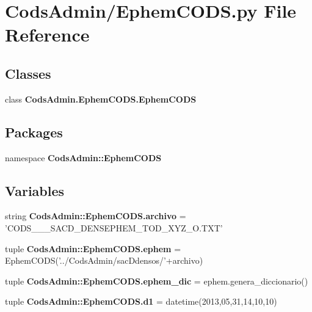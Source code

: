 \section{\-Cods\-Admin/\-Ephem\-C\-O\-D\-S.py \-File \-Reference}
\label{_ephem_c_o_d_s_8py}
\subsection*{\-Classes}
\begin{DoxyCompactItemize}
\item 
class {\bf \-Cods\-Admin.\-Ephem\-C\-O\-D\-S.\-Ephem\-C\-O\-D\-S}
\end{DoxyCompactItemize}
\subsection*{\-Packages}
\begin{DoxyCompactItemize}
\item 
namespace {\bf \-Cods\-Admin\-::\-Ephem\-C\-O\-D\-S}
\end{DoxyCompactItemize}
\subsection*{\-Variables}
\begin{DoxyCompactItemize}
\item 
string {\bf \-Cods\-Admin\-::\-Ephem\-C\-O\-D\-S.\-archivo} = '\-C\-O\-D\-S\-\_\-\_\-\_\-\-S\-A\-C\-D\-\_\-\-D\-E\-N\-S\-E\-P\-H\-E\-M\-\_\-\-T\-O\-D\-\_\-\-X\-Y\-Z\-\_\-\-O.\-T\-X\-T'
\item 
tuple {\bf \-Cods\-Admin\-::\-Ephem\-C\-O\-D\-S.\-ephem} = \-Ephem\-C\-O\-D\-S('../\-Cods\-Admin/sac\-Ddensos/'+archivo)
\item 
tuple {\bf \-Cods\-Admin\-::\-Ephem\-C\-O\-D\-S.\-ephem\-\_\-dic} = ephem.\-genera\-\_\-diccionario()
\item 
tuple {\bf \-Cods\-Admin\-::\-Ephem\-C\-O\-D\-S.\-d1} = datetime(2013,05,31,14,10,10)
\end{DoxyCompactItemize}
